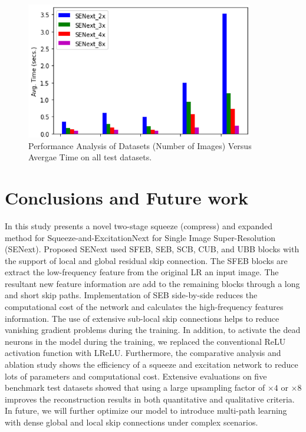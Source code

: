 \documentclass{ieeeaccess}
\begin{document}
\begin{figure}[ht]
  \includegraphics[width=\linewidth]{21FIGURE.pdf}
  \caption{Performance Analysis of Datasets (Number of Images) Versus Avergae Time on all test datasets.}
  \label{fig:21}
\end{figure}




\section{Conclusions and Future work}
In this study presents a novel two-stage squeeze (compress) and expanded method for Squeeze-and-ExcitationNext for Single Image Super-Resolution (SENext). Proposed SENext used SFEB, SEB, SCB, CUB, and UBB blocks with the support of local and global residual skip connection. The SFEB blocks are extract the low-frequency feature from the original LR an input image. The resultant new feature information are add to the remaining blocks through a long
and short skip paths. Implementation of SEB side-by-side reduces the computational cost of the network and calculates the high-frequency features information.
 The use of extensive sub-local skip connections helps to reduce vanishing gradient problems during the training. In addition, to activate the dead neurons in the model during the training, we replaced the conventional ReLU activation function with LReLU. Furthermore, the comparative analysis and ablation study shows the efficiency of a squeeze and excitation network to reduce lots of parameters and computational cost. Extensive evaluations on five benchmark test datasets showed that using a large upsampling factor of $\times 4$ or $\times 8$ improves the reconstruction results in both quantitative and qualitative criteria. In future, we will further optimize our model to introduce multi-path learning with dense global and local skip connections under complex scenarios.
\end{document}
